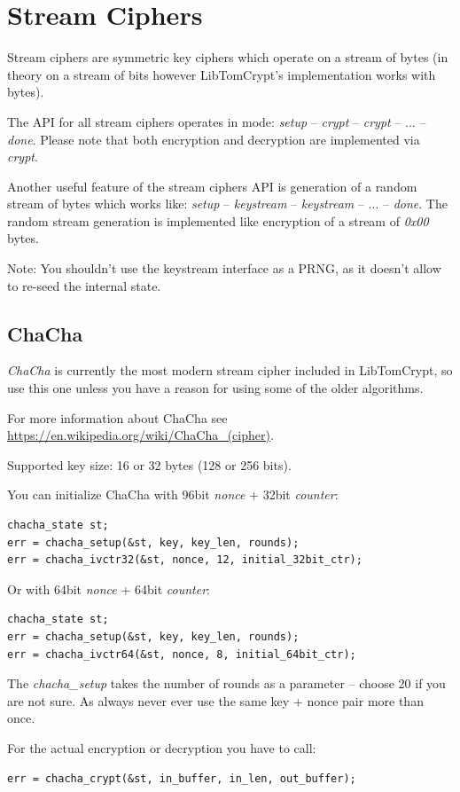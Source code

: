 \documentclass[synpaper]{book}
\newcommand{\mysection}[1]    %
	{                   %
	\section{#1}
   \markboth{\textsf{www.libtom.net}}{\thesection ~ {#1}}
	}
\begin{document}
\chapter{Stream Ciphers}

Stream ciphers are symmetric key ciphers which operate on a stream of bytes (in theory on a stream of bits
however LibTomCrypt's implementation works with bytes).

The API for all stream ciphers operates in mode: \textit{setup} -- \textit{crypt} -- \textit{crypt} -- ... -- \textit{done}.
Please note that both encryption and decryption are implemented via \textit{crypt}.

Another useful feature of the stream ciphers API is generation of a random stream of bytes which works like:
\textit{setup} -- \textit{keystream} -- \textit{keystream} -- ... -- \textit{done}. The random stream generation is
implemented like encryption of a stream of \textit{0x00} bytes.

Note: You shouldn't use the keystream interface as a PRNG, as it doesn't allow to re-seed the internal state.

\mysection{ChaCha}

\textit{ChaCha} is currently the most modern stream cipher included in LibTomCrypt, so use this one unless you
have a reason for using some of the older algorithms.

For more information about ChaCha see \url{https://en.wikipedia.org/wiki/ChaCha_(cipher)}.

Supported key size: 16 or 32 bytes (128 or 256 bits).

You can initialize ChaCha with 96bit \textit{nonce} + 32bit \textit{counter}:
\begin{verbatim}
chacha_state st;
err = chacha_setup(&st, key, key_len, rounds);
err = chacha_ivctr32(&st, nonce, 12, initial_32bit_ctr);
\end{verbatim}

Or with 64bit \textit{nonce} + 64bit \textit{counter}:
\begin{verbatim}
chacha_state st;
err = chacha_setup(&st, key, key_len, rounds);
err = chacha_ivctr64(&st, nonce, 8, initial_64bit_ctr);
\end{verbatim}

The \textit{chacha\_setup} takes the number of rounds as a parameter -- choose 20 if you are not sure.
As always never ever use the same key + nonce pair more than once.

For the actual encryption or decryption you have to call:
\begin{verbatim}
err = chacha_crypt(&st, in_buffer, in_len, out_buffer);
\end{verbatim}
\end{document}
